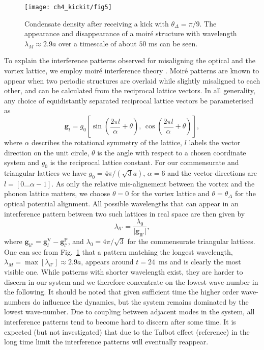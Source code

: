 	\begin{figure}[bt]
        \centering
		\texttt{[image: ch4\_kickit/fig5]}
		\caption{Condensate density after receiving a kick with $\theta_\Delta=\pi/9$. The appearance and disappearance of a moir\'e structure with wavelength $\lambda_M \approx 2.9 a$ over a timescale of about $50$ ms can be seen.}
		\label{fig:dtheta20_ev}
	\end{figure}

    To explain the interference patterns observed for misaligning the optical and the vortex lattice, we employ moir\'e interference theory \cite{SS:Kerman_jphyscon_2012}. Moir\'e patterns are known to appear when two periodic structures are overlaid while slightly misaligned to each other, and can be calculated from the reciprocal lattice vectors. In all generality, any choice of equidistantly separated reciprocal lattice vectors be parameterised as
    	\begin{equation}
    		\mathbf{g}_{l} = g_0 \left[ \sin\left( \frac{2\pi l}{\alpha}+\theta \right),\, \cos\left( \frac{2\pi l}{\alpha} +\theta\right) \right],
    	\end{equation}
    where $\alpha$ describes the rotational symmetry of the lattice, $l$ labels the vector direction on the unit circle, $\theta$ is the angle with respect to a chosen coordinate system and $g_0$ is the reciprocal lattice constant. For our commensurate and triangular lattices we have $g_0=4\pi/(\sqrt{3}a)$, $\alpha=6$ and the vector directions are $l=\left[0\dots\alpha-1\right]$. As only the relative mis-alignement between the vortex and the phonon lattice matters, we choose $\theta=0$ for the vortex lattice and $\theta=\theta_\Delta$ for the optical potential alignment.
    All possible wavelengths that can appear in an interference pattern between two such lattices in real space are then given by
    	\begin{equation}
    		\lambda_{ll'} = \frac{\lambda_0}{|\mathbf{\mathbf{g}_{ll'}|}},
    		\label{eq:InterferenceVectors}
    	\end{equation}
    where
    $\mathbf{g}_{ll'}=\mathbf{g}_{l}^{\text{V}}-\mathbf{g}_{l'}^{\text{P}}$, and
    $\lambda_0 = 4\pi/\sqrt{3}$ for the commensurate triangular lattices.
    One can see from Fig.~\ref{fig:dtheta20_ev} that a pattern matching the longest wavelength, $\lambda_M= \max[\lambda_{ll'}] \approx 2.9 a$, appears around $t=24$~ms and is clearly the most visible one. While patterns with shorter wavelength exist, they are harder to discern in our system and we therefore concentrate on the lowest wave-number in the following. It should be noted that given sufficient time the higher order wave-numbers do influence the dynamics, but the system remains dominated by the lowest wave-number. Due to coupling between adjacent modes in the system, all interference patterns tend to become hard to discern after some time. It is expected (but not investigated) that due to the Talbot effect (reference) in the long time limit the interference patterns will eventually reappear.

